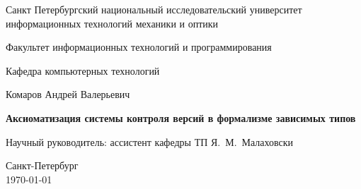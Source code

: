\documentclass[a4paper]{report}
\theoremstyle{plain}
\theoremstyle{definition}
\begin{document}
\pagestyle{title}

\begin{center}
  Санкт Петербургский национальный исследовательский университет\\
  информационных технологий механики и оптики\\
  \hrulefill
 
\vspace{2cm}

Факультет информационных технологий и программирования

Кафедра компьютерных технологий

\vspace{3cm}

{\Large Комаров Андрей Валерьевич}

\vspace{2cm}

\vbox{\LARGE\bfseries Аксиоматизация системы контроля версий в
  формализме зависимых типов }

\vspace{4cm}

{\Large Научный руководитель: ассистент кафедры ТП Я.~М.~Малаховски}

\vspace{6cm}

Санкт-Петербург\\ \today
\end{center}


\newpage
\pagestyle{plain}

\tableofcontents

\startthechapters



%


\printbibliography
\end{document}
